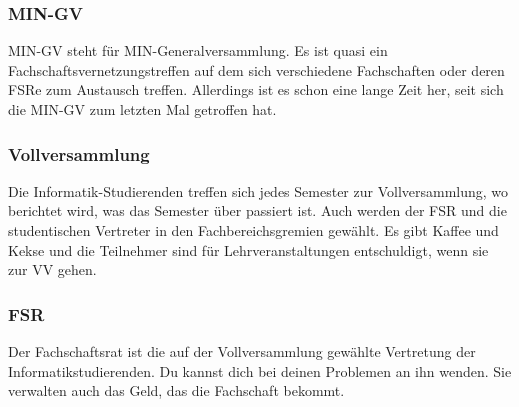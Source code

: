 \documentclass[a4paper,11pt]{scrartcl} %
\begin{document}
\subsubsection{MIN-GV}
MIN-GV steht für MIN-Generalversammlung. Es ist quasi ein Fachschaftsvernetzungstreffen auf dem sich verschiedene Fachschaften oder deren FSRe zum Austausch treffen. Allerdings ist es schon eine lange Zeit her, seit sich die MIN-GV zum letzten Mal getroffen hat.

\subsubsection{Vollversammlung}
Die Informatik-Studierenden treffen sich jedes Semester zur Vollversammlung, wo berichtet wird, was das Semester über passiert ist. Auch werden der FSR und die studentischen Vertreter in den Fachbereichsgremien gewählt. Es gibt Kaffee und Kekse und die Teilnehmer sind für Lehrveranstaltungen entschuldigt, wenn sie zur VV gehen.

\subsubsection{FSR}
Der Fachschaftsrat ist die auf der Vollversammlung gewählte Vertretung der Informatikstudierenden. Du kannst dich bei deinen Problemen an ihn wenden. Sie verwalten auch das Geld, das die Fachschaft bekommt.
\end{document}
